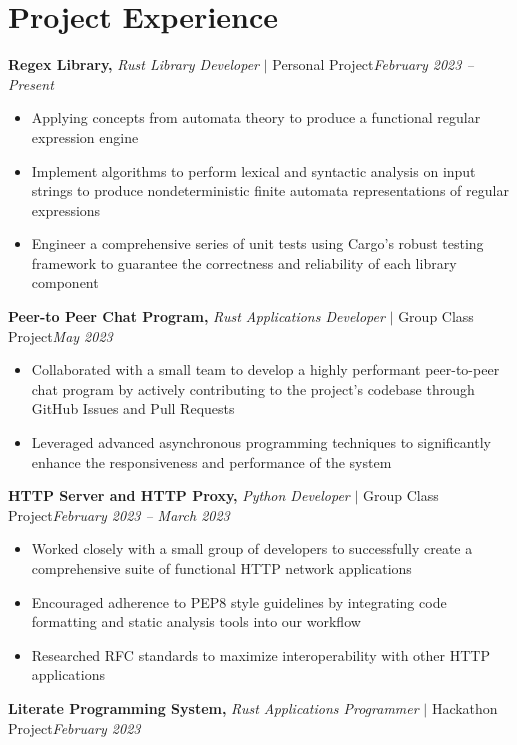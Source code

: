 \documentclass[8pt]{extarticle}
\newcommand{\jobentry}[4]{\textbf{#1,} \textit{#2} \(|\) #3\hfill \textit{#4}}
\begin{document}
\section{Project Experience}

\jobentry{Regex Library}{Rust Library Developer}{Personal Project}{February 2023 -- Present}

\begin{itemize}
  \item{Applying concepts from automata theory to produce a functional regular expression engine}
  \item{Implement algorithms to perform lexical and syntactic analysis on input strings to produce nondeterministic finite automata representations of regular expressions}
  \item{Engineer a comprehensive series of unit tests using Cargo’s robust testing framework to guarantee the correctness and reliability of each library component}
\end{itemize}

\jobentry{Peer-to Peer Chat Program}{Rust Applications Developer}{Group Class Project}{May 2023}

\begin{itemize}
\item{Collaborated with a small team to develop a highly performant peer-to-peer chat program by actively contributing to the project's codebase through GitHub Issues and Pull Requests}
\item{Leveraged advanced asynchronous programming techniques to significantly enhance the responsiveness and performance of the system}
\end{itemize}

\jobentry{HTTP Server and HTTP Proxy}{Python Developer}{Group Class Project}{February 2023 -- March 2023}

\begin{itemize}
  \item{Worked closely with a small group of developers to successfully create a comprehensive suite of functional HTTP network applications}
  \item{Encouraged adherence to PEP8 style guidelines by integrating code formatting and static analysis tools into our workflow}
  \item{Researched RFC standards to maximize interoperability with other HTTP applications}
\end{itemize}

\jobentry{Literate Programming System}{Rust Applications Programmer}{Hackathon Project}{February 2023}
\end{document}

